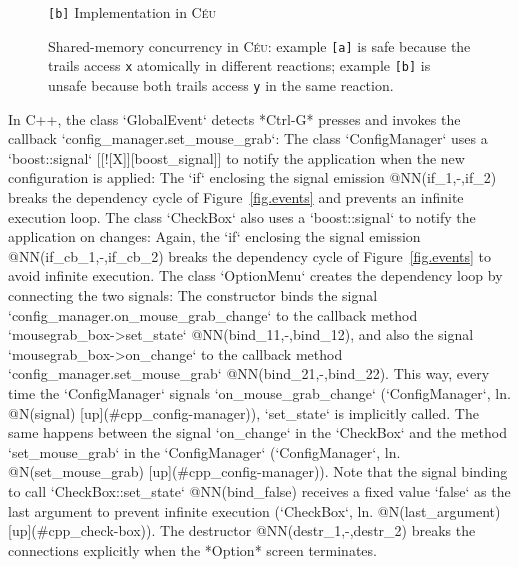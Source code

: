 \documentclass{vgtc}                          %
\newcommand{\CEU}{\textsc{C\'{e}u}\xspace}
\newcommand{\code}[1] {{\small{\texttt{#1}}}}
\newcommand{\ax}{\code{[a]}\xspace}
\newcommand{\bx}{\code{[b]}\xspace}
\begin{document}
\begin{figure}
\begin{minipage}[t]{0.40\linewidth}
\begin{lstlisting}[numbers=left,xleftmargin=3em]
\end{lstlisting}
\centering\small{\bx Implementation in \CEU}
\end{minipage}
\caption{ Shared-memory concurrency in \CEU:
example \ax is safe because the trails access \code{x} atomically in different 
reactions;
example \bx is unsafe because both trails access \code{y} in the same reaction.
\label{lst.shared}
}
\end{figure}

In C++, the class `GlobalEvent` detects *Ctrl-G*
presses and invokes the callback `config\_manager.set\_mouse\_grab`:
%
The class `ConfigManager` uses a `boost::signal`
[[![X]][boost\_signal]] to notify the application when the new configuration is
applied:
%
The `if` enclosing the signal emission @NN(if\_1,-,if\_2) breaks the dependency 
cycle of Figure~\ref{fig.events} and prevents an infinite execution loop.
%
The class `CheckBox` also uses a `boost::signal` to 
notify the application on changes:
%
Again, the `if` enclosing the signal emission @NN(if\_cb\_1,-,if\_cb\_2) breaks the 
dependency cycle of Figure~\ref{fig.events} to avoid infinite execution.
%
The class `OptionMenu` creates the dependency loop by
connecting the two signals:
%
The constructor binds
the signal `config\_manager.on\_mouse\_grab\_change` to the callback method
           `mousegrab\_box->set\_state`
           @NN(bind\_11,-,bind\_12),
and also
the signal `mousegrab\_box->on\_change` to the callback method
           `config\_manager.set\_mouse\_grab`
           @NN(bind\_21,-,bind\_22).
This way, every time the `ConfigManager` signals `on\_mouse\_grab\_change`
(`ConfigManager`, ln. @N(signal) [up](\#cpp\_config-manager)), `set\_state` is
implicitly called.
The same happens between the signal `on\_change` in the `CheckBox` and the 
method `set\_mouse\_grab` in the `ConfigManager`
(`ConfigManager`, ln. @N(set\_mouse\_grab) [up](\#cpp\_config-manager)).
%
Note that the signal binding to call `CheckBox::set\_state` @NN(bind\_false) 
receives a fixed value `false` as the last argument to prevent infinite
execution (`CheckBox`, ln. @N(last\_argument) [up](\#cpp\_check-box)).
%
The destructor @NN(destr\_1,-,destr\_2) breaks the connections explicitly when
the *Option* screen terminates.
\end{document}
